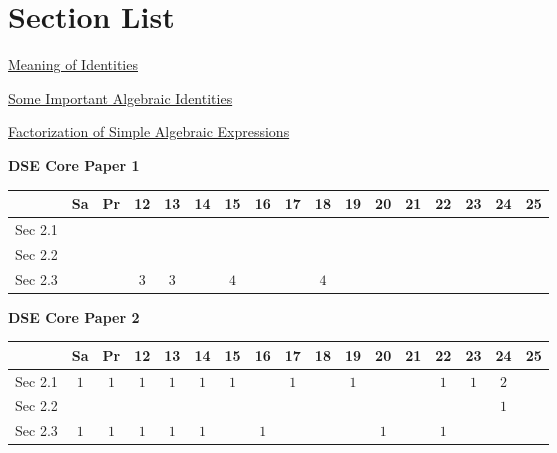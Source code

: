 \documentclass[12pt, a4paper]{article}
\begin{document}
\section*{Section List}
\begin{enumx}[label=Sec 2.\arabic*\ ]
\item \hyperref[section:2-2-1]{Meaning of Identities}
\item \hyperref[section:2-2-2]{Some Important Algebraic Identities}
\item \hyperref[section:2-2-3]{Factorization of Simple Algebraic Expressions}
\end{enumx}
\begin{absolutelynopagebreak}
\begin{center}
\textbf{DSE Core Paper 1}
\end{center}
\begin{center}
\begin{tabular}{|l|c|c|c|c|c|c|c|c|c|c|c|c|c|c|c|c|}
\hline
        & Sa & Pr & 12 & 13 & 14 & 15 & 16 & 17 & 18 & 19 & 20 & 21 & 22 & 23 & 24 & 25 \\\hline\hline
Sec 2.1 &  &  &  &  &  &  &  &  &  &  &  &  &  &  &  &  \\\hline
Sec 2.2 &  &  &  &  &  &  &  &  &  &  &  &  &  &  &  &  \\\hline
Sec 2.3 &  &  &  $3$ &  $3$ &  &  $4$ &  &  &  $4$ &  &  &  &  &  &  &  \\\hline
\end{tabular}
\end{center}
\end{absolutelynopagebreak}
\begin{absolutelynopagebreak}
\begin{center}
\textbf{DSE Core Paper 2}
\end{center}
\begin{center}
\begin{tabular}{|l|c|c|c|c|c|c|c|c|c|c|c|c|c|c|c|c|}
\hline
        & Sa & Pr & 12 & 13 & 14 & 15 & 16 & 17 & 18 & 19 & 20 & 21 & 22 & 23 & 24 & 25 \\\hline\hline
Sec 2.1 &  $1$ &  $1$ &  $1$ &  $1$ &  $1$ &  $1$ &  &  $1$ &  &  $1$ &  &  &  $1$ &  $1$ &  $2$ &  \\\hline
Sec 2.2 &  &  &  &  &  &  &  &  &  &  &  &  &  &  &  $1$ &  \\\hline
Sec 2.3 &  $1$ &  $1$ &  $1$ &  $1$ &  $1$ &  &  $1$ &  &  &  &  $1$ &  &  $1$ &  &  &  \\\hline
\end{tabular}
\end{center}
\end{absolutelynopagebreak}
\end{document}
